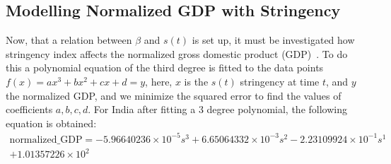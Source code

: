 \documentclass[tikz,fleqn,12pt]{wlscirep}
\begin{document}
\subsection{Modelling Normalized GDP with Stringency}
Now, that a relation between $\beta$ and $s(t)$ is set up, it must be investigated how stringency index affects the normalized gross domestic product (GDP)~\cite{OECDNormalizedGDP,OECDNormalizedGDP2}. To do this a polynomial equation of the third degree is fitted to the data points $f(x) = a x^3 + b x^2 + c x + d = y$, here, $x$ is the $s(t)$ stringency at time $t$, and $y$ the normalized GDP, and we minimize the squared error to find the values of coefficients $a, b, c, d$. For India after fitting a 3 degree polynomial, the following equation is obtained:
\begin{equation}
    \begin{split}
      \textrm{normalized\_GDP} = -5.96640236 \times 10^{-5} s^{3} + 6.65064332 \times 10^{-3} s^{2} - 2.23109924 \times 10^{-1} s^{1} \\
    + 1.01357226 \times 10^{2}
    \end{split}
    \label{eq:gdp_modelled_with_stringency_IND}
\end{equation}
\end{document}
